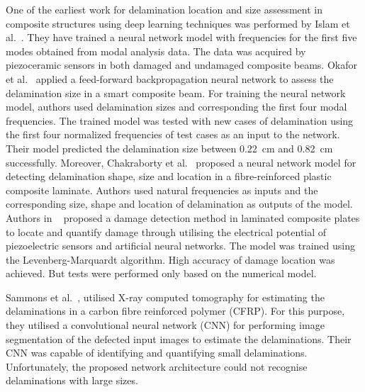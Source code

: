 \documentclass[preprint,9pt]{elsarticle}
\begin{document}
One of the earliest work for delamination location and size assessment in composite structures using deep learning techniques was performed by Islam et al.~\cite{islam1994damage}. 
They have trained a neural network model with frequencies for the first five modes obtained from modal analysis data. 
The data was acquired by piezoceramic sensors in both damaged and undamaged composite beams.
Okafor et al.~\cite{okafor1996delamination} applied a feed-forward backpropagation neural network to assess the delamination size in a smart composite beam. 
For training the neural network model, authors used delamination sizes and corresponding the first four modal frequencies. 
The trained model was tested with new cases of delamination using the first four normalized frequencies of test cases as an input to the network. 
Their model predicted the delamination size between 0.22~cm and 0.82~cm successfully.
Moreover, Chakraborty et al.~\cite{chakraborty2005artificial} proposed a neural network model for detecting delamination shape, size and location in a fibre-reinforced plastic composite laminate.
Authors used natural frequencies as inputs and the corresponding size, shape and location of delamination as outputs of the model. 
Authors in ~\cite{roseiro2005neural}  proposed a damage detection method in laminated composite plates to locate and quantify damage through utilising the electrical potential of piezoelectric sensors and artificial neural networks. 
The model was trained using the Levenberg-Marquardt algorithm. High accuracy of damage location was achieved.
But tests were performed only based on the numerical model.  

Sammons et al.~\cite{sammons2016segmenting}, utilised X-ray computed tomography for estimating the delaminations in a carbon fibre reinforced polymer (CFRP). 
For this purpose, they utilised a convolutional neural network (CNN) for performing image segmentation of the defected input images to estimate the delaminations. 
Their CNN was capable of identifying and quantifying small delaminations. 
Unfortunately, the proposed network architecture could not recognise delaminations with large sizes.
 
\end{document}
